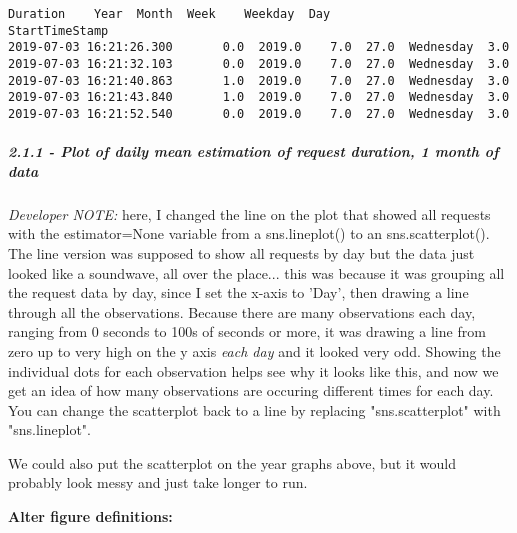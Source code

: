 \documentclass[11pt]{article}
\makeatletter
\newcommand{\boxspacing}{\kern\kvtcb@left@rule\kern\kvtcb@boxsep}
\newcommand{\prompt}[4]{
        \ttfamily\llap{{\color{#2}[#3]:\hspace{3pt}#4}}\vspace{-\baselineskip}
    }
\makeatother
\begin{document}
            \begin{tcolorbox}[breakable, size=fbox, boxrule=.5pt, pad at break*=1mm, opacityfill=0]
\prompt{Out}{outcolor}{391}{\boxspacing}
\begin{Verbatim}[commandchars=\\\{\}]
                         Duration    Year  Month  Week    Weekday  Day
StartTimeStamp
2019-07-03 16:21:26.300       0.0  2019.0    7.0  27.0  Wednesday  3.0
2019-07-03 16:21:32.103       0.0  2019.0    7.0  27.0  Wednesday  3.0
2019-07-03 16:21:40.863       1.0  2019.0    7.0  27.0  Wednesday  3.0
2019-07-03 16:21:43.840       1.0  2019.0    7.0  27.0  Wednesday  3.0
2019-07-03 16:21:52.540       0.0  2019.0    7.0  27.0  Wednesday  3.0
\end{Verbatim}
\end{tcolorbox}
        
    \subparagraph{2.1.1 - Plot of daily mean estimation of request duration,
1 month of
data}\label{plot-of-daily-mean-estimation-of-request-duration-1-month-of-data}

    \emph{Developer NOTE:} here, I changed the line on the plot that showed
all requests with the estimator=None variable from a sns.lineplot() to
an sns.scatterplot(). The line version was supposed to show all requests
by day but the data just looked like a soundwave, all over the place...
this was because it was grouping all the request data by day, since I
set the x-axis to 'Day', then drawing a line through all the
observations. Because there are many observations each day, ranging from
0 seconds to 100s of seconds or more, it was drawing a line from zero up
to very high on the y axis \emph{each day} and it looked very odd.
Showing the individual dots for each observation helps see why it looks
like this, and now we get an idea of how many observations are occuring
different times for each day. You can change the scatterplot back to a
line by replacing "sns.scatterplot" with "sns.lineplot".

We could also put the scatterplot on the year graphs above, but it would
probably look messy and just take longer to run.

    \textbf{Alter figure definitions:}
\end{document}
